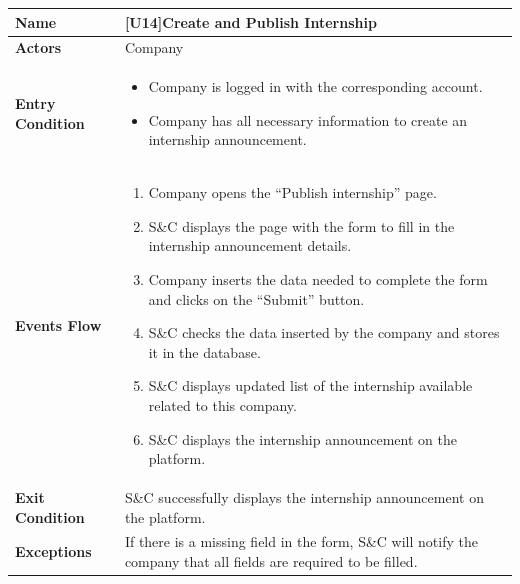 \begin{center}
    \begin{tabular}{|p{9em}|p{27em}|}
        \hline
        \rowcolor{bluepoli!40} %
        \textbf{Name} & \textbf{[U14]Create and Publish Internship} \\
        \hline
        \textbf{Actors} & Company \\
        \hline
        \textbf{Entry Condition} & 
        \begin{itemize}
            \item Company is logged in with the corresponding account.
            \item Company has all necessary information to create an internship announcement.
        \end{itemize} \\
        \hline
        \textbf{Events Flow} & 
        \begin{enumerate}
            \item Company opens the ``Publish internship'' page.
            \item S\&C displays the page with the form to fill in the internship announcement details.
            \item Company inserts the data needed to complete the form and clicks on the ``Submit'' button.
            \item S\&C checks the data inserted by the company and stores it in the database.
            \item S\&C displays updated list of the internship available related to this company.
            \item S\&C displays the internship announcement on the platform.
        \end{enumerate} \\
        \hline
        \textbf{Exit Condition} & 
        S\&C successfully displays the internship announcement on the platform.\\
        \hline
        \textbf{Exceptions} &
        If there is a missing field in the form, S\&C will notify the company that all fields are required to be filled.\\
        \hline
    \end{tabular}
\end{center}

